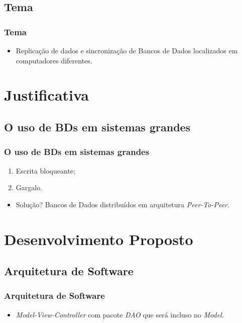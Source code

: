 \documentclass{beamer}
\begin{document}
\subsection{Tema}

\begin{frame}
\frametitle{Tema}

\begin{itemize}
\item Replicação de dados e sincronização de Bancos de Dados localizados em computadores diferentes.
\end{itemize}
\end{frame}

\section{Justificativa}

\subsection{O uso de BDs em sistemas grandes}
\begin{frame}
\frametitle{O uso de BDs em sistemas grandes}

\begin{enumerate}
\item Escrita bloqueante;
\item Gargalo.
\end{enumerate}

\vfill
\begin{itemize}
\item Solução? Bancos de Dados distribuídos em arquitetura \emph{Peer-To-Peer}.
\end{itemize}
\end{frame}

\section{Desenvolvimento Proposto}
\subsection{Arquitetura de Software}
\begin{frame}
\frametitle{Arquitetura de Software}
\begin{itemize}
\item \emph{Model-View-Controller} com pacote \emph{DAO} que será incluso no \emph{Model}.
\end{itemize}
\end{frame}
\end{document}
